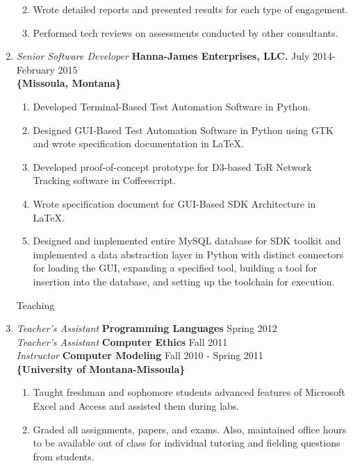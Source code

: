 \documentclass[oneside]{article}%
\begin{document}
\begin{enumerate}[]
\begin{enumerate}[*]
\begin{enumerate}[.]
				\end{enumerate}
			\item Wrote detailed reports and presented results for each type of engagement.
			\item Performed tech reviews on assessments conducted by other consultants.
		\end{enumerate}
	\item \textit{Senior Software Developer} \textbf{Hanna-James Enterprises, LLC.} \hfill July 2014-February 2015\\
		\textbf{\{Missoula, Montana\}}
		\begin{enumerate}[*]
			\item Developed Terminal-Based Test Automation Software in Python.
			\item Designed GUI-Based Test Automation Software in Python using GTK and wrote specification documentation in \LaTeX.
			\item Developed proof-of-concept prototype for D3-based ToR Network Tracking software in Coffeescript.
			\item Wrote specification document for GUI-Based SDK Architecture in \LaTeX.
			\item Designed and implemented entire MySQL database for SDK toolkit and implemented a data abstraction layer in Python with distinct connectors for loading the GUI, expanding a specified tool, building a tool for insertion into the database, and setting up the toolchain for execution.
		\end{enumerate}

\newpage
\huge{Teaching}
\small
	\item \textit{Teacher's Assistant} \textbf{Programming Languages} \hfill Spring 2012\\
		\textit{Teacher's Assistant} \textbf{Computer Ethics} \hfill Fall 2011\\
		\textit{Instructor} \textbf{Computer Modeling} \hfill Fall 2010 - Spring 2011\\
		\textbf{\{University of Montana-Missoula\}}
		\begin{enumerate}[*]
			\item Taught freshman and sophomore students advanced features of Microsoft Excel and Access and assisted them during labs.
			\item Graded all assignments, papers, and exams. Also, maintained office hours to be available out of class for individual tutoring and fielding questions from students.
		\end{enumerate}
\end{enumerate}
\end{document}
